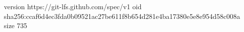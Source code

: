 version https://git-lfs.github.com/spec/v1
oid sha256:ccaf6d4ec3fda0b09521ac27be611f8b654d281e4ba17380e5e8e954d58c008a
size 735
